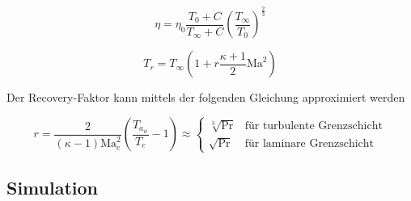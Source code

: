 \begin{equation}
  \label{eq:dynamische_viskositaet}
  \eta = \eta_0 \frac{T_0 + C}{T_{\infty} + C} {\left( \frac{T_{\infty}}{T_0} \right)}^{\frac{2}{3}}
\end{equation}

\begin{equation}
  \label{eq:recovery_temperatur}
  T_r = T_{\infty} \left( 1 + r \frac{\kappa + 1}{2} \text{Ma}^2 \right)
\end{equation}

Der Recovery-Faktor kann mittels der folgenden Gleichung approximiert werden

\begin{equation}
  \label{eq:recovery_faktor}
  r = \frac{2}{\left(\kappa - 1\right) \text{Ma}_e^2} \left(\frac{T_{a_{w}}}{T_e} - 1\right) \approx
  \begin{cases}
    \sqrt[3]{\text{Pr}} & \text{für turbulente Grenzschicht}\\
    \sqrt{\text{Pr}} & \text{für laminare Grenzschicht}
  \end{cases}
\end{equation}

\subsection{Simulation}

